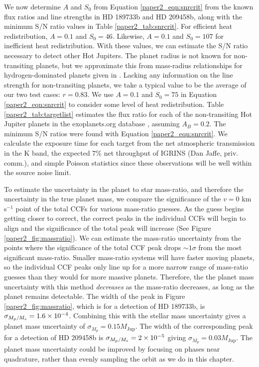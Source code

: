 We now determine $A$ and $S_0$ from Equation \ref{paper2_eqn:snrcrit} from the known flux ratios and line strengths in HD 189733b and HD 209458b, along with the minimum S/N ratio values in Table \ref{paper2_tab:snrcrit}. For efficient heat redistribution, $A=0.1$ and $S_0 = 46$. Likewise, $A=0.1$ and $S_0 = 107$ for inefficient heat redistribution. With these values, we can estimate the S/N ratio necessary to detect other Hot Jupiters. The planet radius is not known for non-transiting planets, but we approximate this from mass-radius relationships for hydrogen-dominated planets given in \cite{Swift2012}. Lacking any information on the line strength for non-transiting planets, we take a typical value to be the average of our two test cases: $r = 0.83$. We use $A=0.1$ and $S_0=75$ in Equation \ref{paper2_eqn:snrcrit} to consider some level of heat redistribution. Table \ref{paper2_tab:targetlist} estimates the flux ratio for each of the non-transiting Hot Jupiter planets in the exoplanets.org database \citep{exoplanet}, assuming $A_B = 0.2$. The minimum S/N ratios were found with Equation \ref{paper2_eqn:snrcrit}. We calculate the exposure time for each target from the net atmospheric transmission in the K band, the expected $7\%$ net throughput of IGRINS (Dan Jaffe, priv. comm.), and simple Poisson statistics since these observations will be well within the source noise limit.

To estimate the uncertainty in the planet to star mass-ratio, and therefore the uncertainty in the true planet mass, we compare the significance of the $v=0$ km s$^{-1}$ point of the total CCFs for various mass-ratio guesses. As the guess begins getting closer to correct, the correct peaks in the individual CCFs will begin to align and the significance of the total peak will increase (See Figure \ref{paper2_fig:massratio}). We can estimate the mass-ratio uncertainty from the points where the significance of the total CCF peak drops $\sim 1 \sigma$ from the most significant mass-ratio. Smaller mass-ratio systems will have faster moving planets, so the individual CCF peaks only line up for a more narrow range of mass-ratio guesses than they would for more massive planets. Therefore, the the planet mass uncertainty with this method \emph{decreases} as the mass-ratio decreases, as long as the planet remains detectable. The width of the peak in Figure \ref{paper2_fig:massratio}, which is for a detection of HD 189733b, is $\sigma_{M_p/M_s} = 1.6\times 10^{-4}$. Combining this with the stellar mass uncertainty gives a planet mass uncertainty of $\sigma_{M_p} = 0.15 M_\mathrm{ Jup}$. The width of the corresponding peak for a detection of HD 209458b is $\sigma_{M_p/M_s} = 2\times 10^{-5}$ giving $\sigma_{M_p} = 0.03 M_\mathrm{ Jup}$. The planet mass uncertainty could be improved by focusing on phases near quadrature, rather than evenly sampling the orbit as we do in this chapter.



